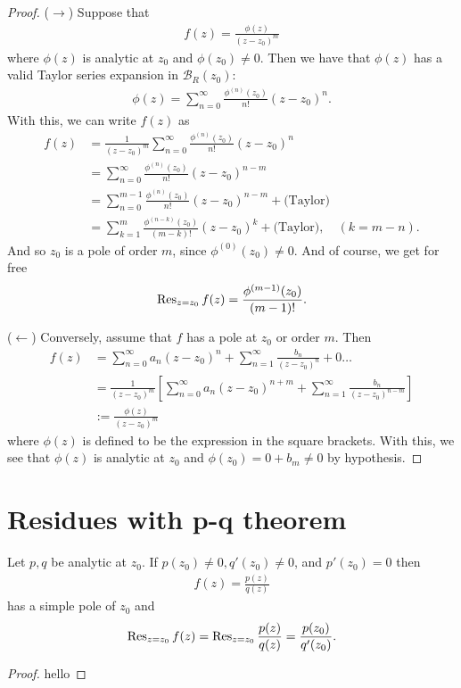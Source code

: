 \documentclass{article}
\theoremstyle{definition}
\newcommand{\f}[2]{\frac{#1}{#2}}
\newcommand{\lb}{\left[}
\newcommand{\rb}{\right]}
\begin{document}
\begin{proof}
	($\rightarrow$) Suppose that 
	\begin{align}
	f(z) = \f{\phi(z)}{(z-z_0)^m}
	\end{align}
	where $\phi(z)$ is analytic at $z_0$ and $\phi(z_0) \neq 0$. Then we have that $\phi(z)$ has a valid Taylor series expansion in $\mathcal{B}_R(z_0)$:
	\begin{align}
	\phi(z) = \sum^\infty_{n=0} \f{\phi^{(n)}(z_0)}{n!}(z- z_0)^n.
	\end{align} 
	With this, we can write $f(z)$ as
	\begin{align}
	f(z) &= \f{1}{(z-z_0)^m} \sum^\infty_{n=0}\f{\phi^{(n)}(z_0)}{n!}(z-z_0)^n\nonumber\\
	&= \sum^\infty_{n=0}\f{\phi^{(n)}(z_0)}{n!}(z-z_0)^{n-m}\nonumber\\
	&= \sum^{m-1}_{n=0}\f{\phi^{(n)}(z_0)}{n!}(z-z_0)^{n-m} + \text{(Taylor)}\nonumber\\
	&= \sum^{m}_{k=1}\f{\phi^{(n-k)}(z_0)}{(m-k)!}(z-z_0)^{k} + \text{(Taylor)}, \quad (k= m-n).
	\end{align}
	And so $z_0$ is a pole of order $m$, since $\phi^{(0)}(z_0) \neq 0$. And of course, we get for free
	\begin{align}
	\Res_{z = z_0} f(z) = \f{\phi^{(m-1)}(z_0)}{(m-1)!}.
	\end{align}
	
 	($\leftarrow$) Conversely, assume that $f$ has a pole at $z_0$ or order $m$. Then 
 	\begin{align}
 	f(z) &= \sum^\infty_{n=0}a_n(z-z_0)^n + \sum^\infty_{n=1} \f{b_n}{(z - z_0)^n} + 0 \dots\nonumber\\
 	&= \f{1}{(z-z_0)^m}\lb \sum^\infty_{n=0}a_n(z-z_0)^{n+m} + \sum^\infty_{n=1} \f{b_n}{(z - z_0)^{n-m}}   \rb\nonumber\\
 	&:= \f{\phi(z)}{(z - z_0)^m}
 	\end{align}
 	where $\phi(z)$ is defined to be the expression in the square brackets. With this, we see that $\phi(z)$ is analytic at $z_0$ and $\phi(z_0) = 0 + b_m \neq 0 $ by hypothesis. \qedhere
\end{proof}




\section{Residues with p-q theorem}
Let $p,q$ be analytic at $z_0$. If $p(z_0) \neq 0, q'(z_0) \neq 0$, and $p'(z_0) = 0$ then
\begin{align}
f(z) = \f{p(z)}{q(z)}
\end{align}
has a simple pole of $z_0$ and 
\begin{align}
\Res_{z = z_0} f(z) =\Res_{z = z_0}\f{p(z)}{q(z)} = \f{p(z_0)}{q'(z_0)}.
\end{align}
\begin{proof}
	hello
\end{proof}
\end{document}
